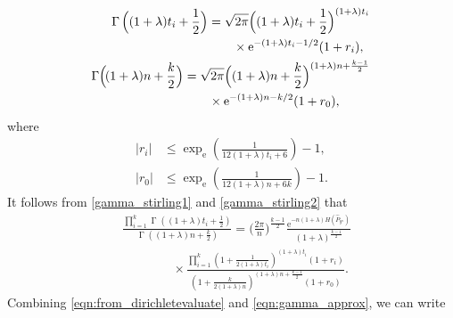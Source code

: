 \documentclass[journal, 10pt]{IEEEtran}
\newcommand{\rme}{\mathrm{e}}
\theoremstyle{plain}
\theoremstyle{plain}
\theoremstyle{plain}
\theoremstyle{plain}
\newcommand{\opGamma}{\operatorname{\Gamma}}
\begin{document}
\begin{align}
\begin{split}
\hspace{-0.5mm}\opGamma\Big((1+\lambda)t_i+\frac12\Big) &= \sqrt{2\pi}\Big((1+\lambda)t_i+\frac12\Big)^{(1+\lambda)t_i}  \\
 & \qquad  \times \rme^{-(1+\lambda)t_i - 1/2}(1+r_i)\text{,}
\end{split}  \label{gamma_stirling1}  \\
\begin{split}
\hspace{-0.5mm}\opGamma \hspace{-0.6mm} \Big(\hspace{-0.4mm} (1+\lambda)n+\frac k2\Big) &= \sqrt{2\pi}\Big((1+\lambda)n + \frac k2\Big)^{(1+\lambda)n+\frac{k-1}2} \\
&\qquad  \times \rme^{-(1+\lambda)n - k/2}(1+r_0)\text{,} 
\end{split} \label{gamma_stirling2}
\end{align}
where
\begin{align}
|r_i|&\leq \exp_\rme \left( \frac{1}{12(1+\lambda)t_i+6} \right) -1\text{,} \label{eqn:error:gamma stirling1}   \\
|r_0|&\leq \exp_\rme \left( \frac{1}{12(1+\lambda)n+6k}\right) -1 \label{eqn:error:gamma stirling2} \text{.}
\end{align}
It follows from \eqref{gamma_stirling1} and \eqref{gamma_stirling2} that
\begin{align}
&\frac{\prod_{i=1}^k\opGamma\left((1+\lambda)t_i+\frac 12\right)}{\opGamma\left((1+\lambda)n+\frac k2\right)}= \Big(\frac{2\pi}{n}\Big)^{\frac{k-1}{2}}  \frac{\rme^{-n(1+\lambda)H(\widehat{P}_{y ^n})}}{(1+\lambda)^{\frac{k-1}{2}}} \nonumber \\
&\qquad \qquad \times \frac{\prod_{i=1}^k\left(1+\frac{1}{2(1+\lambda)t_i}\right)^{(1+\lambda)t_i}(1+r_i)}{\left(1+\frac{k}{2(1+\lambda)n}\right)^{(1+\lambda)n+\frac{k-1}{2}} (1+r_0)}  \text{.} \label{eqn:gamma_approx}
\end{align}
Combining \eqref{eqn:from_dirichletevaluate} and \eqref{eqn:gamma_approx}, we can write
\end{document}
